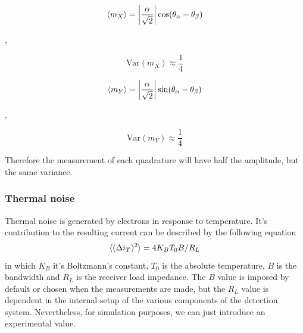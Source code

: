 \begin{bibunit}[plain]
%
\begin{center}
	\begin{minipage}{58mm}
		\noindent
		\begin{equation}
			\braket{m_X} = \left|\frac{\alpha}{\sqrt{2}}\right| \cos({\theta_\alpha - \theta_\beta})
		\end{equation}
	\end{minipage}
	$,\quad$
	\begin{minipage}{37mm}
		\noindent
		\begin{equation}
			\textrm{Var}(m_X) \approx \frac{1}{4}
		\end{equation}
	\end{minipage}
\end{center}
%
%
\begin{center}
	\begin{minipage}{58mm}
		\noindent
		\begin{equation}
			\braket{m_Y} =  \left|\frac{\alpha}{\sqrt{2}}\right| \sin({\theta_\alpha - \theta_\beta})
		\end{equation}
	\end{minipage}
	$,\quad$
	\begin{minipage}{37mm}
		\noindent
		\begin{equation}
			\textrm{Var}(m_Y) \approx \frac{1}{4}
		\end{equation}
	\end{minipage}
\end{center}
%
Therefore the measurement of each quadrature will have half the amplitude, but the same variance.
%
%
%
\subsubsection{Thermal noise}
Thermal noise is generated by electrons in response to temperature. It's contribution to the resulting current can be described by the following equation
\cite{fox2006}
%
\begin{equation}
\braket{(\Delta i_T)^2} = 4 K_B T_0 B/R_L
\end{equation}
%
in which $K_B$ it's Boltzmann's constant, $T_0$ is the absolute temperature, $B$ is the bandwidth and $R_L$ is the receiver load impedance. The $B$ value is imposed by default or chosen when the measurements are made, but the $R_L$ value is dependent in the internal setup of the various components of the detection system. Nevertheless, for simulation purposes, we can just introduce an experimental value.\\
\vspace{1cm}
%
%

\end{bibunit}
